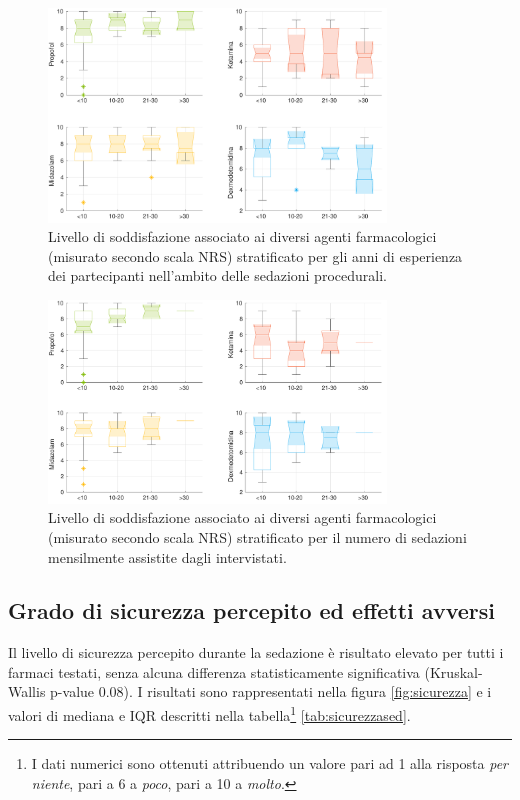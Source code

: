 \begin{figure}[h]
    \centering
    \includegraphics[width=0.8\textwidth]{Figure/qualita-strat-esperienza.pdf}
    \caption{Livello di soddisfazione associato ai diversi agenti farmacologici (misurato secondo scala NRS) stratificato per gli anni di esperienza dei partecipanti nell'ambito delle sedazioni procedurali.}
    \label{fig:qualitaesperienza}
\end{figure}

\begin{figure}[!h]
    \centering
    \includegraphics[width=0.8\textwidth]{Figure/qualita-strat-frequenza.pdf}
    \caption{Livello di soddisfazione associato ai diversi agenti farmacologici (misurato secondo scala NRS) stratificato per il numero di sedazioni mensilmente assistite dagli intervistati.}
    \label{fig:qualitafrequenza}
\end{figure}

\newpage

\subsection*{Grado di sicurezza percepito ed effetti avversi}

Il livello di sicurezza percepito durante la sedazione è risultato elevato per tutti i farmaci testati, senza alcuna differenza statisticamente significativa (Kruskal-Wallis p-value 0.08). I risultati sono rappresentati nella figura \ref{fig:sicurezza} e i valori di mediana e IQR descritti nella tabella\footnote{I dati numerici sono ottenuti attribuendo un valore pari ad 1 alla risposta \emph{per niente}, pari a 6 a \emph{poco}, pari a 10 a \emph{molto}.} \ref{tab:sicurezzased}.

